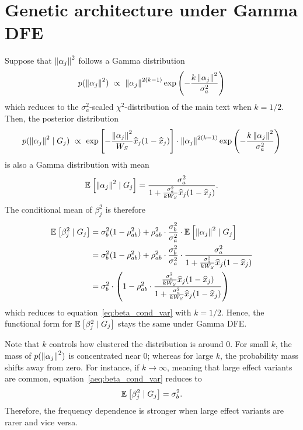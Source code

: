 \documentclass[10pt]{article}
\begin{document}
\section{Genetic architecture under Gamma DFE}
\label{apx:Gamma_dfe}

Suppose that $\left\| \alpha_j \right\|^2$ follows a Gamma distribution
\begin{align*}
    p(\left\| \alpha_j \right\|^2) \ \propto \
    \left\| \alpha_j \right\|^{2(k-1)} \exp\left(-\frac{k\left\| \alpha_j \right\|^2}{\sigma_a^2} \right)
\end{align*}
which reduces to the $\sigma_a^2$-scaled $\chi^2$-distribution of the main text when $k=1/2$.
Then, the posterior distribution 
\begin{equation*}
    p(\norm{\alpha_j}^2 \mid G_j) \ \propto \ \exp\left[-\frac{\norm{\alpha_j}^2}{W_S}\hx_j(1-\hx_j) \right] \cdot
    \norm{\alpha_j}^{2(k-1)} \exp\left(-\frac{k\norm{\alpha_j}^2}{\sigma_a^2} \right)
\end{equation*}
is also a Gamma distribution with mean
\begin{align}\label{aeq:}
    \mathbb{E}_{}\left[\left\| \alpha_j \right\|^2 \mid G_j\right]
    = \frac{\sigma_a^2}{1 + \frac{\sigma_a^2}{kW_S}\widehat{x}_j(1-\widehat{x}_j)}.
\end{align}
The conditional mean of $\beta_j^2$ is therefore
\begin{align} \label{aeq:beta_cond_var}
    \begin{aligned}
       \mathbb{E}_{}\left[\beta_j^2 \mid G_j\right] 
       &=\sigma_b^2 (1- \rho_{ab}^2) + \rho_{ab}^2 \cdot \frac{\sigma_b^2}{\sigma_a^2} \cdot 
       \mathbb{E}_{}\left[\left\| \alpha_j \right\|^2 \mid G_j\right] \\
       &=\sigma_b^2 (1- \rho_{ab}^2) + \rho_{ab}^2 \cdot \frac{\sigma_b^2}{\sigma_a^2} \cdot 
       \frac{\sigma_a^2}{1 + \frac{\sigma_a^2}{kW_S}\widehat{x}_j(1-\widehat{x}_j)} \\
       &=
       \sigma_b^2 \cdot
    \left(
        1 - \rho_{ab}^2 \cdot 
        \frac{
        \frac{\sigma_a^2}{kW_S}\widehat{x}_j(1-\widehat{x}_j) 
        }{
        1+ \frac{\sigma_a^2}{kW_S}\widehat{x}_j(1-\widehat{x}_j)
        }
    \right)
    \end{aligned}
\end{align}
which reduces to equation~\eqref{eq:beta_cond_var} with $k=1/2$.
Hence, the functional form for $\mathbb{E}_{}\left[\beta_j^2 \mid G_j\right]$ stays the same under Gamma DFE.

Note that $k$ controls how clustered the distribution is around 0.
For small $k$, the mass of $p(\left\| \alpha_j \right\|^2)$ is concentrated near 0;
whereas for large $k$, the probability mass shifts away from zero.
For instance, if $k \rightarrow \infty$, meaning that large effect variants are common, equation~\eqref{aeq:beta_cond_var} reduces to
\begin{align}
    \mathbb{E}_{}\left[\beta_j^2 \mid G_j\right] = \sigma_b^2.
\end{align}
Therefore, the frequency dependence is stronger when large effect variants are rarer and vice versa.
\end{document}
